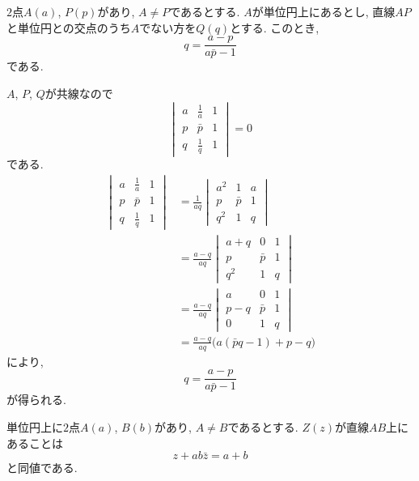 %
%
\begin{bthm}\label{thm:intersection0}
$2$点$A(a)$, $P(p)$があり, $A\neq P$であるとする.
$A$が単位円上にあるとし, 直線$AP$と単位円との交点のうち$A$でない方を$Q(q)$とする.
このとき,
\[q=\frac{a-p}{a\bar{p}-1}\]
である.
\end{bthm}
\begin{prf*}
$A$, $P$, $Q$が共線なので
\[\begin{vmatrix}a&\frac 1a&1\\p&\bar p&1\\q&\frac 1q&1\end{vmatrix}=0\]
である.
\begin{align*}
\begin{vmatrix}a&\frac 1a&1\\p&\bar p&1\\q&\frac 1q&1\end{vmatrix}
&=\frac 1{aq}\begin{vmatrix}a^2&1&a\\p&\bar p&1\\q^2&1&q\end{vmatrix}\\
&=\frac{a-q}{aq}\begin{vmatrix}a+q&0&1\\p&\bar p&1\\q^2&1&q\end{vmatrix}\\
&=\frac{a-q}{aq}\begin{vmatrix}a&0&1\\p-q&\bar p&1\\0&1&q\end{vmatrix}\\
&=\frac{a-q}{aq}\bigl(a(\bar pq-1)+p-q\bigr)
\end{align*}
により,
\[q=\frac{a-p}{a\bar{p}-1}\]
が得られる.
\end{prf*}
%
%
\begin{bthm}
単位円上に$2$点$A(a)$, $B(b)$があり, $A\neq B$であるとする.
$Z(z)$が直線$AB$上にあることは
\[z+ab\bar z=a+b\]
と同値である.
\end{bthm}
